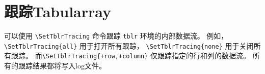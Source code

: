 \documentclass[oneside]{book}
\begin{document}
\section{跟踪Tabularray}

可以使用 \verb!\SetTblrTracing! 命令跟踪 \verb!tblr! 环境的内部数据流。
例如，\verb!\SetTblrTracing{all}! 用于打开所有跟踪，
\verb!\SetTblrTracing{none}! 用于关闭所有跟踪。
而\verb!\SetTblrTracing{+row,+column}! 仅跟踪指定的行和列的数据流。
所有的跟踪结果都将写入log文件。
\end{document}
